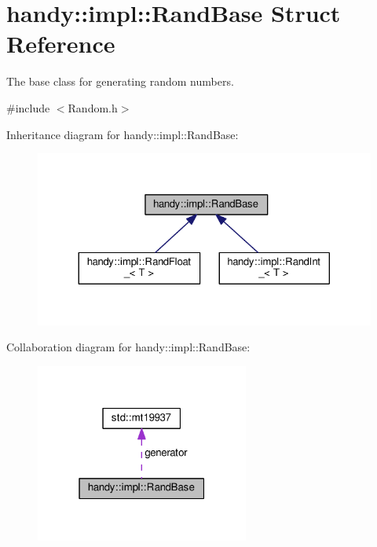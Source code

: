 \hypertarget{structhandy_1_1impl_1_1RandBase}{}\section{handy\+:\+:impl\+:\+:Rand\+Base Struct Reference}
\label{structhandy_1_1impl_1_1RandBase}


The base class for generating random numbers.  




{\ttfamily \#include $<$Random.\+h$>$}



Inheritance diagram for handy\+:\+:impl\+:\+:Rand\+Base\+:\nopagebreak
\begin{figure}[H]
\begin{center}
\leavevmode
\includegraphics[width=324pt]{structhandy_1_1impl_1_1RandBase__inherit__graph}
\end{center}
\end{figure}


Collaboration diagram for handy\+:\+:impl\+:\+:Rand\+Base\+:\nopagebreak
\begin{figure}[H]
\begin{center}
\leavevmode
\includegraphics[width=199pt]{structhandy_1_1impl_1_1RandBase__coll__graph}
\end{center}
\end{figure}
